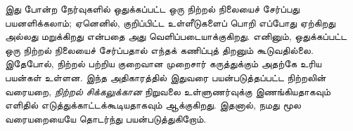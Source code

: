 \documentclass[../../../include/open-logic-section]{subfiles}
\begin{document}
\begin{explain}
இது போன்ற நேர்வுகளில் ஒதுக்கப்பட்ட ஒரு நிற்றல் நிலையைச் சேர்ப்பது
பயனளிக்கலாம்; ஏனெனில், குறிப்பிட்ட உள்ளீடுகளைப் பொறி எப்போது
ஏற்கிறது அல்லது மறுக்கிறது என்பதை அது வெளிப்படையாக்குகிறது. எனினும்,
ஒதுக்கப்பட்ட ஒரு நிற்றல் நிலையைச் சேர்ப்பதால் எந்தக் கணிப்புத் திறனும்
கூடுவதில்லை. இதேபோல், நிற்றல் பற்றிய குறைவான முறைசார் கருத்துக்கும்
அதற்கே உரிய பயன்கள் உள்ளன. இந்த அதிகாரத்தில் இதுவரை பயன்படுத்தப்பட்ட
நிற்றலின் வரையறை, \emph{நிற்றல் சிக்கலுக்கான} நிறுவலை உள்ளுணர்வுக்கு
இணங்கியதாகவும் எளிதில் எடுத்துக்காட்டக்கூடியதாகவும் ஆக்குகிறது.
இதனால், நமது மூல வரையறையையே தொடர்ந்து பயன்படுத்துகிறோம்.
\end{explain}
\end{document}
